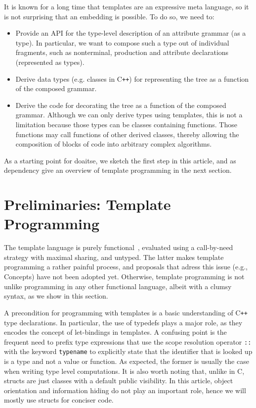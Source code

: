 \documentclass{llncs}
\newcommand*{\Cpp}{C\texttt{++}}
\begin{document}
  It is known for a long time that templates are
  an expressive meta language, so it is not surprising that an
  embedding is possible. To do so, we need to:
  \begin{itemize}
  \item Provide an API for the type-level description of an
    attribute grammar (as a type). In particular, we want to
    compose such a type out of individual fragments, such as
    nonterminal, production and attribute declarations (represented
    as types).
  \item Derive data types (e.g. classes in \Cpp) for representing
    the tree as a function of the composed grammar.
  \item Derive the code for decorating the tree as a function of
    the composed grammar. Although we can only derive types using
    templates, this is not a limitation because those types can
    be classes containing functions. Those functions may call
    functions of other derived classes, thereby allowing the
    composition of blocks of code into arbitrary complex
    algorithms.
  \end{itemize}
  As a starting point for doaitse, we sketch the first step in this article,
  and as dependency give an overview of template programming in the
  next section.

\section{Preliminaries: Template Programming}
\label{sect:templates}

  The template language is purely functional~\cite{DBLP:dblp_journals/entcs/Sinkovics11},
  evaluated using a call-by-need strategy with maximal sharing, and untyped.
  The latter makes template programming a rather painful process,
  and proposals that adress this issue (e.g., Concepts) have not been adopted yet.
  Otherwise, template programming is not unlike programming in any other
  functional language, albeit with a clumsy syntax, as we show
  in this section.

  A precondition for programming with templates is a basic understanding of \Cpp{} type
  declarations.
  In particular, the use of typedefs plays a
  major role, as they encodes the concept of let-bindings in templates.
  A confusing point is the frequent need to prefix type expressions that use
  the scope resolution operator \lstinline$::$ with the keyword
  \lstinline$typename$ to explicitly state that the identifier that
  is looked up is a type and not a value or function. As expected, the
  former is usually the case when writing type level computations.
  It is also worth noting that, unlike in C, structs are just
  classes with a default public visibility. In this article, object
  orientation and information hiding do not play an important role, hence
  we will mostly use structs for conciser code.
\end{document}
